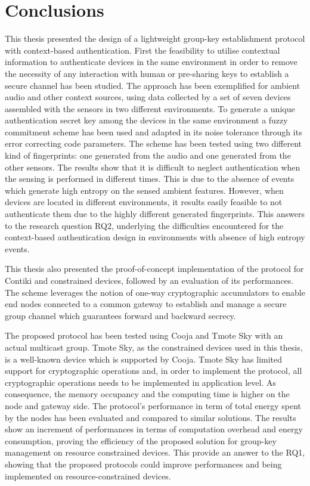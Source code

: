 \chapter{Conclusions}
\label{ch:conclusion}
This thesis presented the design of a lightweight group-key establishment protocol with context-based authentication.
First the feasibility to utilise contextual information to authenticate devices in the same environment in order to remove the necessity of any interaction with human or pre-sharing keys to establish a secure channel has been studied.
The approach has been exemplified for ambient audio and other context sources, using data collected by a set of seven devices assembled with the sensors in two different environments.
To generate a unique authentication secret key among the devices in the same environment a fuzzy commitment scheme has been used and adapted in its noise tolerance through its error correcting code parameters.
The scheme has been tested using two different kind of fingerprints: one generated from the audio and one generated from the other sensors.
The results show that it is difficult to neglect authentication when the sensing is performed in different times.
This is due to the absence of events which generate high entropy on the sensed ambient features.
However, when devices are located in different environments, it results easily feasible to not authenticate them due to the highly different generated fingerprints.
This answers to the research question RQ2, underlying the difficulties encountered for the context-based authentication design in environments with absence of high entropy events.

This thesis also presented the proof-of-concept implementation of the protocol for Contiki and constrained devices, followed by an evaluation of its performances.
The scheme leverages the notion of one-way cryptographic accumulators to enable end nodes connected to a common gateway to establish and manage a secure group channel which guarantees forward and backward secrecy.

The proposed protocol has been tested using Cooja and Tmote Sky with an actual multicast group.
Tmote Sky, as the constrained devices used in this thesis, is a well-known device which is supported by Cooja. 
Tmote Sky has limited support for cryptographic operations and, in order to implement the protocol, all cryptographic operations needs to be implemented in application level. 
As consequence, the memory occupancy and the computing time is higher on the node and gateway side.
The protocol's performance in term of total energy spent by the nodes has been evaluated and compared to similar solutions.
The results show an increment of performances in terms of computation overhead and energy consumption, proving the efficiency of the proposed solution for group-key management on resource constrained devices.
This provide an answer to the RQ1, showing that the proposed protocols could improve performances and being implemented on resource-constrained devices.

